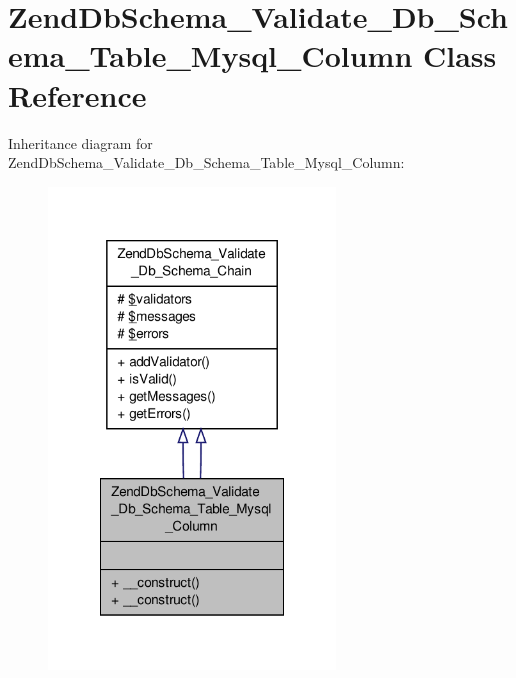\hypertarget{classZendDbSchema__Validate__Db__Schema__Table__Mysql__Column}{\section{Zend\-Db\-Schema\-\_\-\-Validate\-\_\-\-Db\-\_\-\-Schema\-\_\-\-Table\-\_\-\-Mysql\-\_\-\-Column Class Reference}
\label{classZendDbSchema__Validate__Db__Schema__Table__Mysql__Column}
}


Inheritance diagram for Zend\-Db\-Schema\-\_\-\-Validate\-\_\-\-Db\-\_\-\-Schema\-\_\-\-Table\-\_\-\-Mysql\-\_\-\-Column\-:\nopagebreak
\begin{figure}[H]
\begin{center}
\leavevmode
\includegraphics[width=216pt]{classZendDbSchema__Validate__Db__Schema__Table__Mysql__Column__inherit__graph}
\end{center}
\end{figure}


